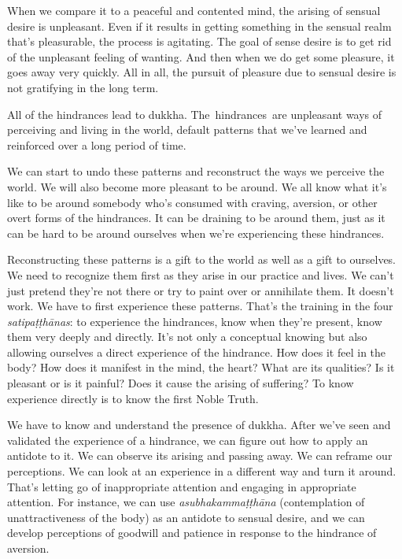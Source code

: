 When we compare it to a peaceful and contented mind, the arising of sensual desire is unpleasant. Even if it results in getting something in the sensual realm that's pleasurable, the process is agitating. The goal of sense desire is to get rid of the unpleasant feeling of wanting. And then when we do get some pleasure, it goes away very quickly. All in all, the pursuit of pleasure due to sensual desire is not gratifying in the long term.

All of the hindrances lead to dukkha. \mbox{The hindrances are} unpleasant ways of perceiving and living in the world, default patterns that we've learned and reinforced over a long period of time.

We can start to undo these patterns and reconstruct the ways we perceive the world. We will also become more pleasant to be around. We all know what it's like to be around somebody who's consumed with craving, aversion, or other overt forms of the hindrances. It can be draining to be around them, just as it can be hard to be around ourselves when we're experiencing these hindrances.

Reconstructing these patterns is a gift to the world as well as a gift to ourselves. We need to recognize them first as they arise in our practice and lives. We can't just pretend they're not there or try to paint over or annihilate them. It doesn't work. We have to first experience these patterns. That's the training in the four \emph{satipaṭṭhānas}: to experience the hindrances, know when they're present, know them very deeply and directly. It's not only a conceptual knowing but also allowing ourselves a direct experience of the hindrance. How does it feel in the body? How does it manifest in the mind, the heart? What are its qualities? Is it pleasant or is it painful? Does it cause the arising of suffering? To know experience directly is to know the first Noble Truth.

We have to know and understand the presence of dukkha. After we've seen and validated the experience of a hindrance, we can figure out how to apply an antidote to it. We can observe its arising and passing away. We can reframe our perceptions. We can look at an experience in a different way and turn it around. That's letting go of inappropriate attention and engaging in appropriate attention. For instance, we can use \emph{asubhakammaṭṭhāna} (contemplation of unattractiveness of the body) as an antidote to sensual desire, and we can develop perceptions of goodwill and patience in response to the hindrance of aversion.

